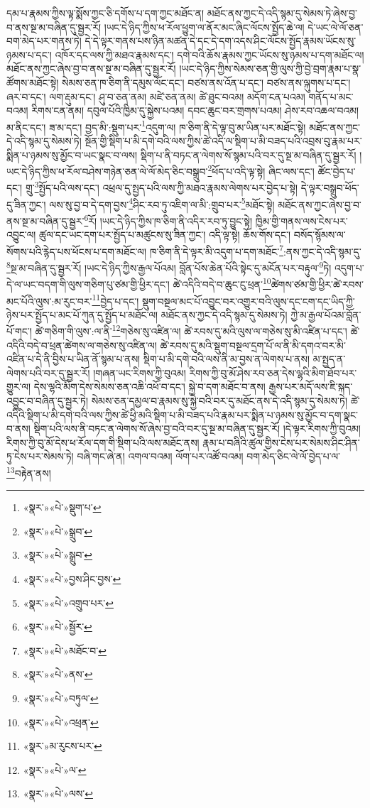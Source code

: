 དམ་པ་རྣམས་ཀྱིས་ལྟ་སྨོས་ཀྱང་ཅི་དགོས་པ་དག་ཀྱང་མཐོང་ན། མཐོང་ནས་ཀྱང་དེ་འདི་སྙམ་དུ་སེམས་ཏེ་ཞེས་བྱ་བ་ནས་སྔ་མ་བཞིན་དུ་སྦྱར་རོ། །ཡང་དེ་ཉིད་ཀྱིས་ཕ་རོལ་ཕྱུག་ལ་ནོར་མང་ཞིང་ལོངས་སྤྱོད་ཆེ་ལ། དེ་ཡང་ལེ་ལོ་ཅན་བག་མེད་པར་གནས་ཏེ། དེ་དེ་ལྟར་གནས་པས་ཉིན་མཚན་དེ་དང་དེ་དག་འདས་ཤིང་ལོངས་སྤྱོད་རྣམས་ཡོངས་སུ་ཉམས་པ་དང་། འཁོར་དང་ལས་ཀྱི་མཐའ་རྣམས་དང་། དགེ་བའི་ཆོས་རྣམས་ཀྱང་ཡོངས་སུ་ཉམས་པ་དག་མཐོང་ལ། མཐོང་ནས་ཀྱང་ཞེས་བྱ་བ་ནས་སྔ་མ་བཞིན་དུ་སྦྱར་རོ། །ཡང་དེ་ཉིད་ཀྱིས་སེམས་ཅན་གྱི་ལུས་ཀྱི་བྱེ་བྲག་རྣམ་པ་སྣ་ཚོགས་མཐོང་སྟེ། སེམས་ཅན་ཁ་ཅིག་ནི་དམུས་ལོང་དང་། བཙས་ནས་འོན་པ་དང་། བཙས་ནས་ལྐུགས་པ་དང་། ཞར་བ་དང་། ལག་རྡུམ་དང་། ཤུ་བ་ཅན་ནམ། མཛེ་ཅན་ནམ། ཚེ་ཐུང་བའམ། མདོག་ངན་པའམ། གནོད་པ་མང་བའམ། རིགས་ངན་ནམ། དབུལ་པོའི་ཁྱིམ་དུ་སྐྱེས་པའམ། དབང་ཆུང་བར་གྲགས་པའམ། ཤེས་རབ་འཆལ་བའམ། མ་ནིང་དང་། ཟ་མ་དང་། བྱད་མི་:སྡུག་པར་\footnote{«སྣར་»«པེ་»སྡུག་པ་}འདུག་ལ། ཁ་ཅིག་ནི་དེ་ལྟ་བུ་མ་ཡིན་པར་མཐོང་སྟེ། མཐོང་ནས་ཀྱང་དེ་འདི་སྙམ་དུ་སེམས་ཏེ། སྔོན་གྱི་སྡིག་པ་མི་དགེ་བའི་ལས་ཀྱིས་ཚེ་འདི་ལ་སྡིག་པ་མི་བཟད་པའི་འབྲས་བུ་རྣམ་པར་སྨིན་པ་ཉམས་སུ་མྱོང་བ་ཡང་སྣང་བ་ལས། སྡིག་པ་ནི་བཏང་ན་ལེགས་སོ་སྙམ་པའི་བར་དུ་སྔ་མ་བཞིན་དུ་སྦྱར་རོ། །ཡང་དེ་ཉིད་ཀྱིས་ཕ་རོལ་བཤེས་གཉེན་ཅན་ལེ་ལོ་མེད་ཅིང་བསྒྲུབ་\footnote{«སྣར་»«པེ་»སྒྲུབ་}ཕོད་པ་འདི་ལྟ་སྟེ། ཞིང་ལས་དང་། ཚོང་བྱེད་པ་དང་། གྲུ་\footnote{«སྣར་»«པེ་»སྒྲུབ་}སྤྱོད་པའི་ལས་དང་། འཕྲལ་དུ་སྤྱད་པའི་ལས་ཀྱི་མཐའ་རྣམས་ལེགས་པར་བྱེད་པ་སྟེ། དེ་ལྟར་བསྒྲུབ་ཕོད་དུ་ཟིན་ཀྱང་། ལས་སུ་བྱ་བ་དེ་དག་བྱས་\footnote{«སྣར་»«པེ་»བྱས་ཤིང་བྱས་}ཤིང་རབ་ཏུ་འཇིག་ལ་མི་:གྲུབ་པར་\footnote{«སྣར་»«པེ་»འགྲུབ་པར་}མཐོང་སྟེ། མཐོང་ནས་ཀྱང་ཞེས་བྱ་བ་ནས་སྔ་མ་བཞིན་དུ་སྦྱར་\footnote{«སྣར་»«པེ་»སྦྱོར་}རོ། །ཡང་དེ་ཉིད་ཀྱིས་ཁ་ཅིག་ནི་འདིར་རབ་ཏུ་བྱུང་སྟེ། ཁྱིམ་གྱི་གནས་ལས་ངེས་པར་འབྱུང་ལ། ཚུལ་དང་ཡང་དག་པར་སྤྱོད་པ་མཚུངས་སུ་ཟིན་ཀྱང་། འདི་ལྟ་སྟེ། ཆོས་གོས་དང་། བསོད་སྙོམས་ལ་སོགས་པའི་རྙེད་པས་ཕོངས་པ་དག་མཐོང་ལ། ཁ་ཅིག་ནི་དེ་ལྟར་མི་འདུག་པ་དག་མཐོང་\footnote{«སྣར་»«པེ་»མཐོང་བ་}:ནས་ཀྱང་དེ་འདི་སྙམ་དུ་\footnote{«སྣར་»«པེ་»ནས་}སྔ་མ་བཞིན་དུ་སྦྱར་རོ། །ཡང་དེ་ཉིད་ཀྱིས་རྒྱལ་པོའམ། བློན་པོས་ཆེན་པོའི་སྟེང་དུ་མངོན་པར་བརྟུལ་\footnote{«སྣར་»«པེ་»བཏུལ་}ཏེ། འདུག་པ་དེ་ལ་ཡང་བདག་གི་ལུས་གཅིག་པུ་ཙམ་གྱི་ཕྱིར་དང་། ཚེ་འདིའི་བདེ་བ་ཆུང་ངུ་ཕྲན་\footnote{«སྣར་»«པེ་»འཕྲན་}ཚེགས་ཙམ་གྱི་ཕྱིར་ཚེ་རབས་མང་པོའི་ལུས་:མ་རུང་བར་\footnote{«སྣར་»མ་རུངས་པར་}བྱེད་པ་དང་། སྡུག་བསྔལ་མང་པོ་འབྱུང་བར་འགྱུར་བའི་ལུས་དང་ངག་དང་ཡིད་ཀྱི་ཉེས་པར་སྤྱོད་པ་མང་པོ་ཀུན་དུ་སྤྱོད་པ་མཐོང་ལ། མཐོང་ནས་ཀྱང་དེ་འདི་སྙམ་དུ་སེམས་ཏེ། ཀྱེ་མ་རྒྱལ་པོའམ་བློན་པོ་གང་། ཚེ་གཅིག་གི་ལུས་:ལ་ནི་\footnote{«སྣར་»«པེ་»ལ་}གཅེས་སུ་འཛིན་ལ། ཚེ་རབས་དུ་མའི་ལུས་ལ་གཅེས་སུ་མི་འཛིན་པ་དང་། ཚེ་འདིའི་བདེ་བ་ཕྲན་ཚེགས་ལ་གཅེས་སུ་འཛིན་ལ། ཚེ་རབས་དུ་མའི་སྡུག་བསྔལ་དྲག་པོ་ལ་ནི་མི་དགའ་བར་མི་འཛིན་པ་དེ་ནི་བྱིས་པ་ཡིན་ནོ་སྙམ་པ་ནས། སྡིག་པ་མི་དགེ་བའི་ལས་ནི་མ་བྱས་ན་ལེགས་པ་ནས། མ་སྤྱད་ན་ལེགས་པའི་བར་དུ་སྦྱར་རོ། །གཞན་ཡང་རིགས་ཀྱི་བུའམ། རིགས་ཀྱི་བུ་མོ་ཤེས་རབ་ཅན་དེས་ལྷའི་མིག་ཐོབ་པར་གྱུར་ལ། དེས་ལྷའི་མིག་དེས་སེམས་ཅན་འཆི་འཕོ་བ་དང་། སྐྱེ་བ་དག་མཐོང་བ་ནས། རྒྱས་པར་མདོ་ལས་ཇི་སྐད་འབྱུང་བ་བཞིན་དུ་སྦྱར་ཏེ། སེམས་ཅན་དམྱལ་བ་རྣམས་སུ་སྐྱེ་བའི་བར་དུ་མཐོང་ནས་དེ་འདི་སྙམ་དུ་སེམས་ཏེ། ཚེ་འདིའི་སྡིག་པ་མི་དགེ་བའི་ལས་ཀྱིས་ཚེ་ཕྱི་མའི་སྡིག་པ་མི་བཟད་པའི་རྣམ་པར་སྨིན་པ་ཉམས་སུ་མྱོང་བ་དག་སྣང་བ་ནས། སྡིག་པའི་ལས་ནི་བཏང་ན་ལེགས་སོ་ཞེས་བྱ་བའི་བར་དུ་སྔ་མ་བཞིན་དུ་སྦྱར་རོ། །དེ་ལྟར་རིགས་ཀྱི་བུའམ། རིགས་ཀྱི་བུ་མོ་དེས་ཕ་རོལ་དག་གི་སྡིག་པའི་ལས་མཐོང་ནས། རྣམ་པ་བཞིའི་ཚུལ་གྱིས་ངེས་པར་སེམས་ཤིང་ཤིན་ཏུ་ངེས་པར་སེམས་ཏེ། བཞི་གང་ཞེ་ན། འགལ་བའམ། ལོག་པར་འཚོ་བའམ། བག་མེད་ཅིང་ལེ་ལོ་བྱེད་པ་ལ་\footnote{«སྣར་»«པེ་»ལས་}བརྟེན་ནས། 